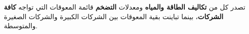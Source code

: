 تصدر كل من \textbf{تكاليف الطاقة والمياه} ومعدلات \textbf{التضخم} قائمة المعوقات التي تواجه \textbf{كافة الشركات}، بينما تباينت بقية المعوقات بين الشركات الكبيرة والشركات الصغيرة والمتوسطة.
